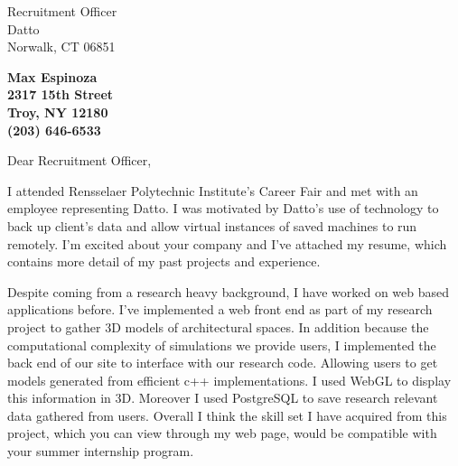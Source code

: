 \documentclass[11pt]{letter} %
\begin{document}

\begin{letter}{
Recruitment Officer\\
Datto\\
Norwalk, CT 06851} 


\begin{center}
\large\bf Max Espinoza \\ %
2317 15th Street \\ Troy, NY 12180 \\ (203) 646-6533 %
\end{center} 


\signature{Max Espinoza} %


\opening{Dear Recruitment Officer,} 

I attended  Rensselaer Polytechnic Institute's Career Fair and met with an employee representing Datto. I was motivated by Datto's use of technology to back up client's data and allow virtual instances of saved machines to run remotely. I'm excited about your company and I’ve attached my resume, which contains more detail of my past projects and experience.

Despite coming from a research heavy background, I have worked on web based applications before. 
I've implemented a web front end as part of my research project to gather 3D models of architectural spaces. 
In addition because the computational complexity of simulations we provide users, I implemented the back end of our site to interface with our research code. Allowing users to get models generated from efficient c++ implementations. I used WebGL to display this information in 3D. Moreover I used  PostgreSQL to save research relevant data gathered from users. 
Overall I think the skill set I have acquired from this project, which you can view through my web page, would be compatible with your summer internship program.


\end{letter}
\end{document}

